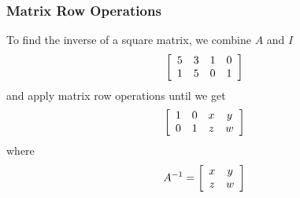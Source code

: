 \documentclass[xcolor=dvipsnames]{beamer}
\begin{document}
\begin{frame}
  \frametitle{Matrix Row Operations}
To find the inverse of a square matrix, we combine $A$ and $I$
  \begin{equation}
    \label{eq:aurohbac}
  \left[\begin{array}{cccc}
 5 & 3 & 1 & 0 \\
 1 & 5 & 0 & 1
  \end{array}\right]\notag
  \end{equation}
and apply matrix row operations until we get
  \begin{equation}
    \label{eq:nahshooh}
  \left[\begin{array}{cccc}
 1 & 0 & x & y \\
 0 & 1 & z & w
  \end{array}\right]\notag
  \end{equation}
where
  \begin{equation}
    \label{eq:aecocaeh}
  A^{-1}=\left[\begin{array}{cc}
 x & y  \\
 z & w 
  \end{array}\right]\notag
  \end{equation}
\end{frame}
\end{document}
